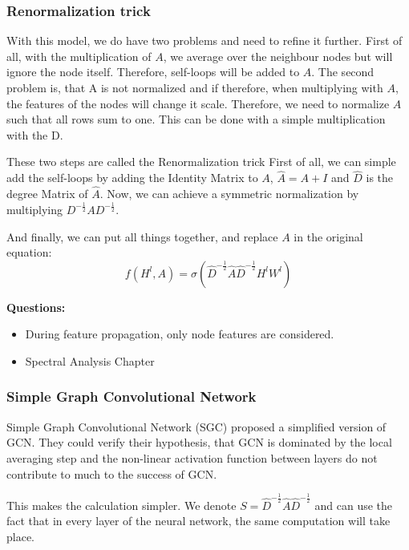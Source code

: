 \subsubsection{Renormalization trick}

With this model, we do have two problems and need to refine it further.
First of all, with the multiplication of $A$, we average over the neighbour nodes but
will ignore the node itself. Therefore, self-loops will be added to $A$.
The second problem is, that A is not normalized and if therefore, when multiplying with $A$,
the features of the nodes will change it scale. Therefore, we need to normalize $A$
such that all rows sum to one. This can be done with a simple multiplication with the D.

These two steps are called the Renormalization trick \cite{GCN}
First of all, we can simple add the self-loops by adding the Identity Matrix to $A$, 
$\hat{A} = A + I$ and $\hat{D}$ is the degree Matrix of $\hat{A}$.
Now, we can achieve a symmetric normalization by multiplying $D^{-\frac{1}{2}} A D^{-\frac{1}{2}}$.

And finally, we can put all things together, and replace $A$ in the original equation:
\begin{equation}
    f( H^l, A) = \sigma (\hat{D}^{-\frac{1}{2}} \hat{A} \hat{D}^{-\frac{1}{2}} H^l W^l)
\end{equation} 


\textbf{Questions:}
\begin{itemize}
    \item During feature propagation, only node features are considered.
    \item Spectral Analysis Chapter
\end{itemize}



\subsubsection{Simple Graph Convolutional Network}
Simple Graph Convolutional Network (SGC) \cite{simpleGCN} proposed a simplified version of GCN.
They could verify their hypothesis, that GCN is dominated by the local averaging step and the non-linear 
activation function between layers do not contribute to much to the success of GCN.

This makes the calculation simpler. We denote $S = \hat{D}^{-\frac{1}{2}} \hat{A} \hat{D}^{-\frac{1}{2}} $
and can use the fact that in every layer of the neural network, the same computation will take place.

